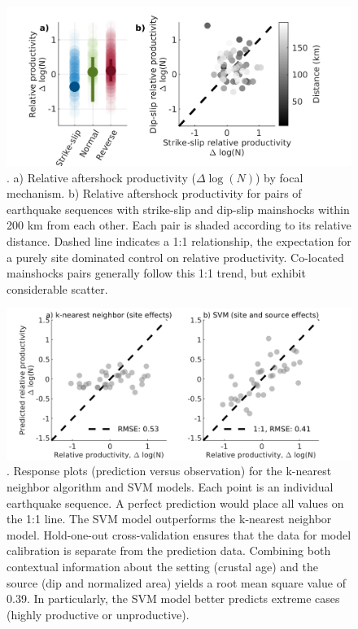 \documentclass[draft]{agujournal}
\begin{document}
\begin{figure}[H]
\centering
\includegraphics{figures/fmspairs_mw5.png}
\caption{. a) Relative aftershock productivity ($\Delta \log(N)$) by focal mechanism. b) Relative aftershock productivity for pairs of earthquake sequences with strike-slip and dip-slip mainshocks within 200 km from each other. Each pair is shaded according to its relative distance. Dashed line indicates a 1:1 relationship, the expectation for a purely site dominated control on relative productivity. Co-located mainshocks pairs generally follow this 1:1 trend, but exhibit considerable scatter.}
\end{figure}

\begin{figure}[H]
\centering
\includegraphics{figures/response_mw5.png}
\caption{. Response plots (prediction versus observation) for the k-nearest neighbor algorithm and SVM models. Each point is an individual earthquake sequence. A perfect prediction would place all values on the 1:1 line. The SVM model outperforms the k-nearest neighbor model. Hold-one-out cross-validation ensures that the data for model calibration is separate from the prediction data. Combining both contextual information about the setting (crustal age) and the source (dip and normalized area) yields a root mean square value of 0.39. In particularly, the SVM model better predicts extreme cases (highly productive or unproductive).}
\label{fig:response}
\end{figure}
\end{document}
